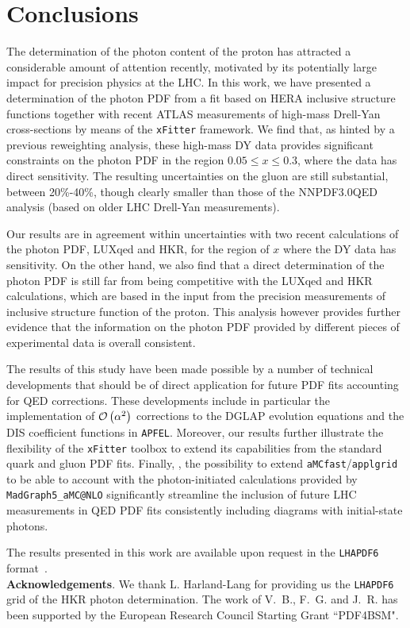 \section{Conclusions}

\label{sec:conclusions}

The determination of the photon content of the proton has
attracted a considerable amount of attention recently, motivated by
its potentially large impact for precision physics at the LHC.
%
In this work, we have presented a determination of the photon PDF from
a fit based on HERA inclusive structure functions together with
recent ATLAS measurements
of high-mass Drell-Yan cross-sections by means of the
{\tt xFitter} framework.
%
We find that, as hinted by a previous reweighting
analysis, these high-mass DY data provides significant constraints on the photon PDF
in the region $0.05 \le x \le 0.3$, where the data has direct
sensitivity.
%
The resulting uncertainties on the gluon are still substantial,
between 20\%-40\%, though clearly smaller than those of the
NNPDF3.0QED analysis (based on older LHC Drell-Yan measurements).

Our results are in agreement within uncertainties with two
recent calculations of the photon PDF,
LUXqed and HKR, for the region of $x$ where the DY data has sensitivity.
%
On the other hand, we also find that a direct determination of the photon PDF
is still far from being competitive with the LUXqed and HKR calculations,
which are based in the input from the
precision measurements of inclusive structure function of the proton.
%
This analysis however provides further evidence that the information
on the photon PDF provided by different pieces of experimental data
is overall consistent.

The results of this study have been made possible by a number of technical developments
that should be of direct application for future PDF fits accounting for QED corrections.
%
These developments include  in particular
the implementation of $\mathcal{O}\left( \alpha^2\right)$ corrections to the DGLAP
evolution equations
and the DIS coefficient functions in {\tt APFEL}.
%
Moreover, our results further
illustrate the flexibility of the {\tt xFitter} toolbox to extend
its capabilities from the standard quark and gluon PDF fits.
%
Finally, , the possibility to extend
{\tt aMCfast}/{\tt applgrid}
to be able to account with the photon-initiated calculations provided
by {\tt MadGraph5\_aMC@NLO} significantly streamline the inclusion
of future LHC measurements in QED PDF fits consistently including
diagrams with initial-state photons.

The results presented in this work are available upon
request in the {\tt LHAPDF6} format~\cite{Buckley:2014ana}.\\

{\bf Acknowledgements}.
%
We thank L. Harland-Lang for providing us the {\tt LHAPDF6} grid
of the HKR photon determination.
%
The work of V.~B., F.~G. and J.~R. has been supported
by the European Research Council Starting Grant ``PDF4BSM".



